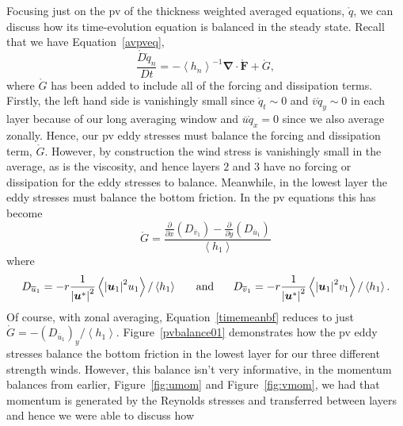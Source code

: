 \documentclass[12pt,a4paper]{report}
\newcommand*\thkmean[1]{\overline{#1}}
\newcommand*\nthkmean[1]{\left\langle{#1}\right\rangle}
\newcommand*\spec[1]{\mathring{#1}}
\newcommand*\figref[1]{Figure~\ref{#1}}
\newcommand*\equref[1]{Equation~\eqref{#1}}
\newcommand*{\partialdiff}[2][{}]{\frac{\partial #1}{\partial #2}}
\begin{document}
  Focusing just on the \gls{pv} of the thickness weighted averaged equations, $\spec{q}$, 
  we can discuss how its time-evolution equation is balanced in the steady state. 
  Recall that we have \equref{avpveq},
  \begin{equation*}
  \frac{\spec{D}\spec{q}_{n}}{D t} 
  =   -\nthkmean{h_{n}}^{-1}
  \boldsymbol{\nabla}
  \cdot\boldsymbol{\spec{F}} +\spec{G} ,
  \end{equation*} 
  where $\spec{G}$ has been added to include all of the forcing and dissipation terms.
  Firstly, the left hand side is vanishingly small since $\spec{q}_{t} \sim 0$ and
  $\thkmean{v}\spec{q}_{y}\sim 0$ in each layer because of our long averaging window
  and $\thkmean{u}\spec{q}_{x} = 0$ since we also average zonally. Hence, our \gls{pv}
  eddy stresses must balance the forcing and dissipation term, $\spec{G}$. 
  However, by construction the wind stress is vanishingly
  small in the average, as is the viscosity, and hence layers $2$ and $3$ have no
  forcing or dissipation for the eddy stresses to balance. Meanwhile, in the lowest layer
  the eddy stresses must balance the bottom friction. In the \gls{pv} equations this
  has become
  \begin{equation}
  \spec{G}=\frac{\partialdiff{x}\left(D_{\thkmean{v}_{1}}\right)-\partialdiff{y}\left(D_{\thkmean{u}_{1}}\right)}{\nthkmean{h_{1}}}
  \label{timemeanbf}
  \end{equation}
  where 
  \begin{equation*}
  D_{\thkmean{u}_{1}}=- r  \frac{ 1 }
  {\left|\boldsymbol{u}^{\ast}\right|^{2}}
  \nthkmean{ { \left|\boldsymbol{u}_{1}\right| }^{2}
  u_{1}}/\nthkmean{h_{1}} \mbox{\hspace{5mm} and \hspace{5mm}}
  D_{\thkmean{v}_{1}}=- r \frac{ 1 }
  {\left|\boldsymbol{u}^{\ast}\right|^{2}}
  \nthkmean{ { \left|\boldsymbol{u}_{1}\right| }^{2}
  	v_{1}}/\nthkmean{h_{1}}.
  \end{equation*} 
  Of course, with zonal averaging, \equref{timemeanbf} reduces to just  $\spec{G}=-\left(D_{\thkmean{u}_{1}}\right)_{y}/{\nthkmean{h_{1}}}$.
  \figref{pvbalance01} demonstrates how the \gls{pv} eddy stresses balance the 
  bottom friction in the lowest layer for our three different strength winds.
  However, this balance isn't very informative, in the momentum balances from 
  earlier,  \figref{fig:umom} and \figref{fig:vmom}, we had that momentum is generated by the Reynolds 
  stresses and transferred between layers and hence we were able to discuss how
\end{document}
